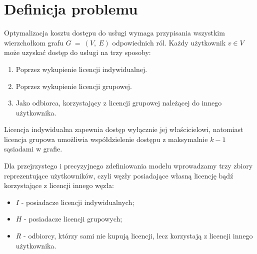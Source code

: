 \section{Definicja problemu}\label{sec:model-formal}

Optymalizacja kosztu dostępu do usługi wymaga przypisania wszystkim wierzchołkom grafu $G ~=~ (V,~E)$ odpowiednich ról. Każdy użytkownik $v \in V$ może uzyskać dostęp do usługi na trzy sposoby:
\begin{enumerate}
  \item Poprzez wykupienie licencji indywidualnej.
  \item Poprzez wykupienie licencji grupowej.
  \item Jako odbiorca, korzystający z licencji grupowej należącej do innego użytkownika.
\end{enumerate}
Licencja indywidualna zapewnia dostęp wyłącznie jej właścicielowi, natomiast licencja grupowa umożliwia współdzielenie dostępu z maksymalnie $k-1$ sąsiadami w grafie.

Dla przejrzystego i precyzyjnego zdefiniowania modelu wprowadzamy trzy zbiory reprezentujące użytkowników, czyli węzły posiadające własną licencję bądź korzystające z licencji innego węzła:
\begin{itemize}
  \item $I$ - posiadacze licencji indywidualnych;
  \item $H$ - posiadacze licencji grupowych;
  \item $R$ - odbiorcy, którzy sami nie kupują licencji, lecz korzystają z licencji innego użytkownika.
\end{itemize}

